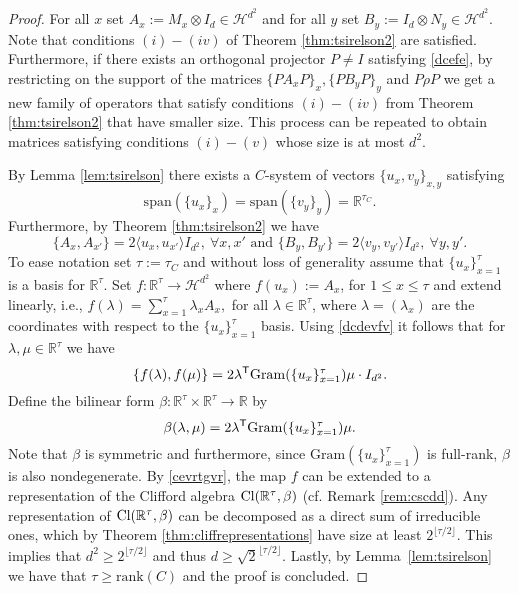 \documentclass{siamart}
\begin{document}
\begin{proof}
For all $x$ set  $A_x:=M_x\otimes I_d \in {\mathcal{H}}^{d^2}$ and  for all $y$ set  $B_y:=I_d\otimes N_y\in{\mathcal{H}}^{d^2}$.
Note that conditions $(i)-(iv)$ of Theorem \ref{thm:tsirelson2}   are satisfied.  Furthermore, if there exists an orthogonal projector $P\ne I$  satisfying  \eqref{dcefe}, by restricting on the support of  the matrices  $\{ PA_{x} P\}_x,\{ PB_{y} P\}_y$ and $P\rho P$  we get a new family of operators that  satisfy conditions  $(i)-(iv)$ from Theorem \ref{thm:tsirelson2}
 that  have smaller size. This  process can be  repeated to obtain matrices  satisfying conditions $(i)-(v)$ whose size  is  at most $d^{2}$.

By Lemma \ref{lem:tsirelson} there exists a $C$-system of vectors $\{u_x,v_y\}_{x,y}$ satisfying
$${\mathrm{span}}(\{u_x\}_x)={\mathrm{span}}(\{v_y\}_y)={\mathbb{R}}^{\tau_C}.$$
Furthermore, by Theorem \ref{thm:tsirelson2} we have
\begin{equation}\label{dcdevfv}
\{A_x,A_{x'}\}=2{\langle} u_x,u_{x'}{\rangle} I_{d^2},\  \forall x,x' \text{ and }\{B_{y},B_{y'}\}=2{\langle} v_y,v_{y'}{\rangle} I_{d^2}, \ \forall y,y'.
\end{equation}
To ease notation set $\tau:=\tau_C$ and without loss of generality  assume that $\{u_x\}_{x=1}^\tau$ is a basis for ${\mathbb{R}}^\tau$.
Set $f :{\mathbb{R}}^\tau \rightarrow {\mathcal{H}}^{d^2}$ where $f(u_x):=A_x$, for $1\le x\le \tau$ and  extend linearly, i.e.,  $f(\lambda)=\sum_{x=1}^{\tau} \lambda_xA_x,$ for all $\lambda\in {\mathbb{R}}^\tau$, where  $\lambda=(\lambda_x)$ are the  coordinates with respect to the  $\{u_x\}_{x=1}^\tau$ basis. Using \eqref{dcdevfv} it follows that  for $\lambda,\mu\in {\mathbb{R}}^\tau$ we have
\begin{equation}\label{cevrtgvr}
\{f(\lambda),f(\mu)\}=2 \lambda^{{\sf T}} {\mathrm{Gram}}(\{u_x\}_{x=1}^\tau)\mu \cdot {I_{d^2}}.
\end{equation}
Define the bilinear form $\beta:{\mathbb{R}}^\tau\times {\mathbb{R}}^\tau\rightarrow {\mathbb{R}}$ by
$$\beta(\lambda,\mu)=2 \lambda^{{\sf T}}{\mathrm{Gram}}(\{u_x\}_{x=1}^\tau)\mu.$$
Note that $\beta$ is symmetric and  furthermore, since ${\mathrm{Gram}}(\{u_x\}_{x=1}^\tau)$ is full-rank, $\beta$ is  also nondegenerate. By  \eqref{cevrtgvr},  the map $f$ can be extended to  a representation of
the Clifford algebra ${\rm Cl}({\mathbb{R}}^\tau,\beta)$ (cf.   Remark \ref{rem:cscdd}). 
Any  representation  of ${\rm Cl}({\mathbb{R}}^\tau,\beta)$ can be {decomposed} as
a direct sum of irreducible ones, which by Theorem
\ref{thm:cliffrepresentations} {have} size at least $2^{\lfloor
\tau/ 2\rfloor}$. This implies that $d^2 \ge 2^{\lfloor
\tau/2\rfloor} $ and thus $d\ge \sqrt{2}^{\lfloor \tau/2\rfloor}$.
Lastly, by Lemma~\ref{lem:tsirelson}  we have that $\tau\ge
{\mathrm{rank}}(C)$ and the proof is concluded. 
\end{proof}
\end{document}
